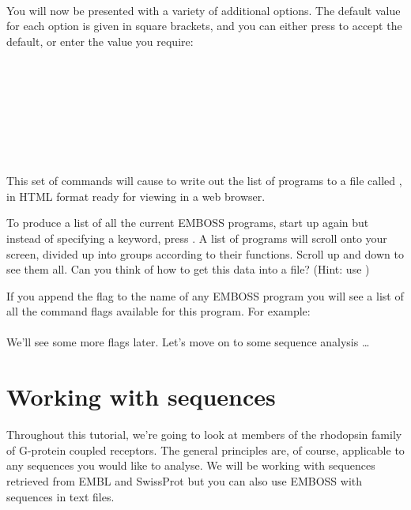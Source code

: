 \documentclass[12pt]{report}
\begin{document}
\unix{}\\

You will now be	presented with a variety of additional options.	The
default	value for each option is given in square brackets, and you can
either press  to accept the default, or enter the
value you require:\\

 \\
 \\
 \\
\\
\\
\\
\\
\\

This set of commands will cause		to write out the
list of	programs to a file called , in HTML format
ready for viewing in a web browser.

To produce a list of all the current EMBOSS programs, start up
	again but instead of specifying	a keyword,
press . A list of programs will scroll onto	your screen,
divided	up into	groups according to their functions. Scroll up and
down to	see them all. Can you think of how to get this data into a
file? (Hint: use )

If you append the flag  to the name	of any EMBOSS program
you will see a list of all the command flags available for this
program. For example:\\

\unix{}\\

We'll see some more flags later. Let's move on to some sequence	analysis \dots

\chapter{Working with sequences}
\label{chap:seqret}
Throughout this	tutorial, we're	going to look at members of the
rhodopsin family of G-protein coupled receptors. The general
principles are,	of course, applicable to any sequences you would like
to analyse. We will be working with sequences retrieved	from EMBL and
SwissProt but you can also use EMBOSS with sequences in	text
files.
\end{document}
